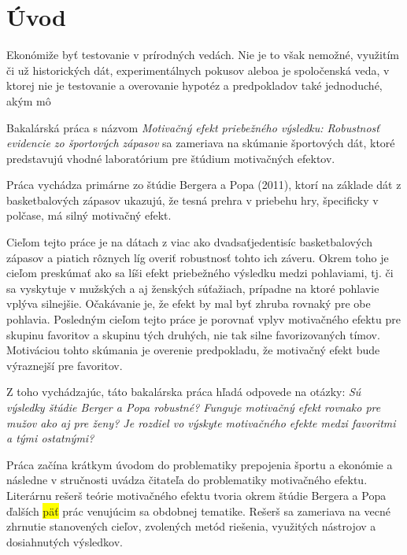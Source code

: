 \documentclass[
  digital, %
  twoside, %
  notable,   %
  lof,     %
  lot,     %
]{fithesis3}
\begin{document}
	\renewcommand{\listfigurename}{Zoznam grafov}
	\makeatletter
	\thesis@preamble %
	\makeatother
	
	\chapter*{Úvod}
	
	Ekonómiže byť testovanie v prírodných vedách. Nie je to však nemožné, využitím či už historických dát, experimentálnych pokusov aleboa je spoločenská veda, v ktorej nie je testovanie a overovanie hypotéz a predpokladov také jednoduché, akým mô  
	
	Bakalárská práca  s názvom \textit{Motivačný efekt priebežného výsledku: Robustnosť evidencie zo športových zápasov} sa zameriava na skúmanie športových dát, ktoré predstavujú vhodné laboratórium pre štúdium motivačných efektov.
	
	Práca vychádza primárne zo štúdie Bergera a Popa (2011), ktorí na základe dát z basketbalových zápasov ukazujú, že tesná prehra v priebehu hry, špecificky v polčase, má silný motivačný efekt. 
	
	Cieľom tejto práce je na dátach z viac ako dvadsaťjedentisíc  basketbalových zápasov a piatich rôznych líg overiť robustnosť tohto ich záveru. Okrem toho je cieľom preskúmať ako sa líši efekt priebežného výsledku medzi pohlaviami, tj. či sa vyskytuje v mužských a aj ženských súťažiach, prípadne na ktoré pohlavie vplýva silnejšie. Očakávanie je, že efekt by mal byť zhruba rovnaký pre obe pohlavia. Posledným cieľom tejto práce je porovnať vplyv motivačného efektu pre skupinu favoritov a skupinu tých druhých, nie tak silne favorizovaných tímov. Motiváciou tohto skúmania je overenie predpokladu, že motivačný efekt bude výraznejší pre favoritov.
	
	Z toho vychádzajúc, táto bakalárska práca hľadá odpovede na otázky: \textit{Sú výsledky štúdie Berger a Popa robustné? Funguje motivačný efekt rovnako pre mužov ako aj pre ženy? Je rozdiel vo výskyte motivačného efekte medzi favoritmi a tými ostatnými?} 
	
	Práca začína krátkym úvodom do problematiky prepojenia športu a ekonómie a následne v stručnosti uvádza čitateľa do problematiky  motivačného efektu. Literárnu rešerš teórie motivačného efektu tvoria okrem štúdie Bergera a Popa ďalších \colorbox{yellow}{päť} prác venujúcim sa obdobnej tematike. Rešerš sa zameriava na vecné zhrnutie stanovených cieľov, zvolených metód riešenia, využitých nástrojov a dosiahnutých výsledkov. 
	
\end{document}
